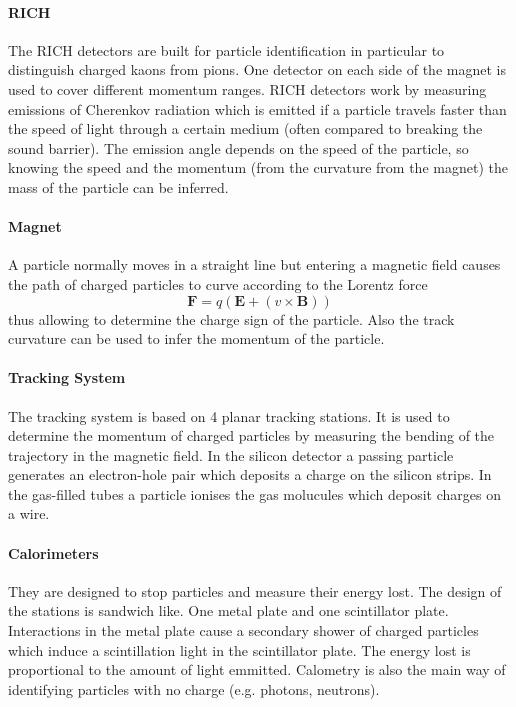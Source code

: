 \documentclass[11pt,twoside]{scrreprt}
\begin{document}
\paragraph{RICH} The RICH detectors are built for particle identification in particular to distinguish charged kaons from pions. 
One detector on each side of the magnet is used to cover different momentum ranges. RICH detectors work by measuring emissions of 
Cherenkov radiation which is emitted if a particle travels faster than the speed of light through a certain medium (often compared 
to breaking the sound barrier). The emission angle depends on the speed of the particle, so knowing the speed and the momentum (from the
curvature from the magnet) the mass of the particle can be inferred.

\paragraph{Magnet} A particle normally moves in a straight line but entering a magnetic field causes the path of charged particles to 
curve according to the Lorentz force 
\[
  \mathbf{F} = q\left( \mathbf{E} + \left( v\times\mathbf{B}\right)\right)
\]
thus allowing to determine the charge sign of the particle. Also the track curvature can be used to infer the momentum of the particle.

\paragraph{Tracking System} The tracking system is based on 4 planar tracking stations. It is used to determine the momentum of charged
particles by measuring the bending of the trajectory in the magnetic field. In the silicon detector a passing particle generates an
electron-hole pair which deposits a charge on the silicon strips. In the gas-filled tubes a particle ionises the gas molucules which deposit
charges on a wire.

\paragraph{Calorimeters} They are designed to stop particles and measure their energy lost. The design of the stations is sandwich like. 
One metal plate and one scintillator plate. Interactions in the metal plate cause a secondary shower of charged particles which induce 
a scintillation light in the scintillator plate. The energy lost is proportional to the amount of light emmitted. Calometry is also the 
main way of identifying particles with no charge (e.g. photons, neutrons).
\end{document}
